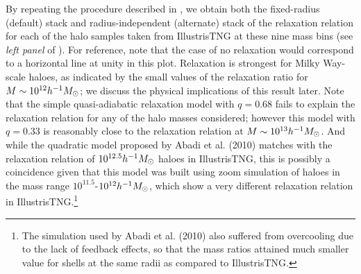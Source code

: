 By repeating the procedure described in , we obtain both the fixed-radius (default) stack and radius-independent (alternate) stack of the relaxation relation for each of the halo samples taken from IllustrisTNG at these nine mass bins (see \emph{left panel} of ). 
For reference, note that the case of no relaxation would correspond to a horizontal line at unity in this plot.
Relaxation is strongest for Milky Way-scale haloes, as indicated by the small values of the relaxation ratio for $M\sim10^{12}h^{-1}M_{\odot}$; we discuss the physical implications of this result later. 
Note that the simple quasi-adiabatic relaxation model  with $q=0.68$ \citep{2015JCAP...12..049S} fails to explain the relaxation relation for any of the halo masses considered; however this model with $q=0.33$ is reasonably close to the relaxation relation at %
$M\sim 10^{13} h^{-1}M_{\odot}$. 
And while the quadratic model proposed by Abadi et al. (2010) \citep{2010MNRAS.407..435A} matches with the relaxation relation of $10^{12.5} h^{-1}M_{\odot}$ haloes in IllustrisTNG, this is possibly a coincidence given that this model was built using zoom simulation of haloes in the mass range $10^{11.5} $-$ 10^{12} h^{-1}M_{\odot}$, which show a very different relaxation relation in IllustrisTNG.\footnote{The simulation used by Abadi et al. (2010) \citep{2010MNRAS.407..435A} also suffered from overcooling due to the lack of feedback effects, so that the mass ratios attained much smaller value for shells at the same radii as compared to IllustrisTNG.}

